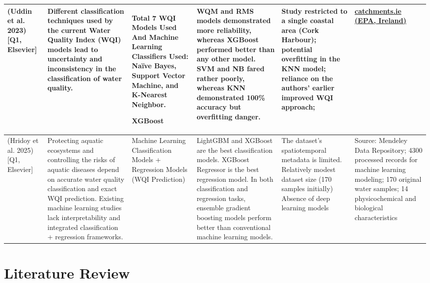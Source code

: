 \documentclass[conference]{IEEEtran}
\begin{document}
\begin{table}[htb!]
\begin{tabular} [htb]{|p{1.6cm}|p{3.1cm}|p{2.7cm}|p{3.1cm}|p{2.5cm}|p{2.6cm}|}
(Uddin et al. 2023)\cite{uddin2023performance} [Q1, Elsevier] & Different classification techniques used by the current Water Quality Index (WQI) models lead to uncertainty and inconsistency in the classification of water quality. & Total 7 WQI Models Used  And Machine Learning Classifiers Used: Naïve Bayes, Support Vector Machine, and K-Nearest Neighbor.

XGBoost & WQM and RMS models demonstrated more reliability, whereas XGBoost performed better than any other model. SVM and NB fared rather poorly, whereas KNN demonstrated 100\% accuracy but overfitting danger. & Study restricted to a single coastal area (Cork Harbour); potential overfitting in the KNN model; reliance on the authors' earlier improved WQI approach;& \href{https://www.catchments.ie/data}{catchments.ie (EPA, Ireland)}\\ 

\hline


(Hridoy et al. 2025)\cite{hridoy2025advanced} [Q1, Elsevier] & Protecting aquatic ecosystems and controlling the risks of aquatic diseases depend on accurate water quality classification and exact WQI prediction. Existing machine learning studies lack interpretability and integrated classification + regression frameworks. & Machine Learning Classification Models + Regression Models (WQI Prediction) & LightGBM and XGBoost are the best classification models.
XGBoost Regressor is the best regression model.
In both classification and regression tasks, ensemble gradient boosting models perform better than conventional machine learning models. & The dataset's spatiotemporal metadata is limited. 
Relatively modest dataset size (170 samples initially)
Absence of deep learning models
 & Source: Mendeley Data Repository; 4300 processed records for machine learning modeling; 170 original water samples; 14 physicochemical and biological characteristics \\
\hline





\end{tabular}
\end{table}



\section{Literature Review}
\end{document}
